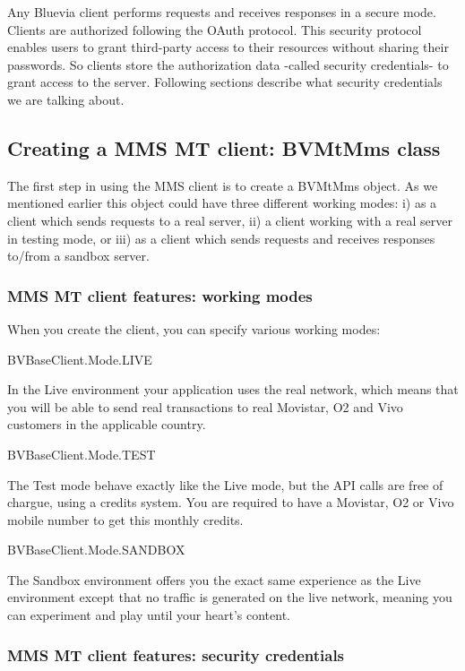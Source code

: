Any Bluevia client performs requests and receives responses in a secure mode. Clients are authorized following the OAuth protocol. This security protocol enables users to grant third-\/party access to their resources without sharing their passwords. So clients store the authorization data -\/called security credentials-\/ to grant access to the server. Following sections describe what security credentials we are talking about.\hypertarget{blv_mms_mt_guide_creating_a_mms_mt_client_sec}{}\subsection{Creating a MMS MT client: BVMtMms class}\label{blv_mms_mt_guide_creating_a_mms_mt_client_sec}
The first step in using the MMS client is to create a BVMtMms object. As we mentioned earlier this object could have three different working modes: i) as a client which sends requests to a real server, ii) a client working with a real server in testing mode, or iii) as a client which sends requests and receives responses to/from a sandbox server.\hypertarget{blv_mms_mt_guide_mms_mt_client_features_working_modes_sec}{}\subsubsection{MMS MT client features: working modes}\label{blv_mms_mt_guide_mms_mt_client_features_working_modes_sec}
When you create the client, you can specify various working modes: 
\begin{DoxyItemize}
\item BVBaseClient.Mode.LIVE \par
In the Live environment your application uses the real network, which means that you will be able to send real transactions to real Movistar, O2 and Vivo customers in the applicable country.


\item BVBaseClient.Mode.TEST \par
The Test mode behave exactly like the Live mode, but the API calls are free of chargue, using a credits system. You are required to have a Movistar, O2 or Vivo mobile number to get this monthly credits.


\item BVBaseClient.Mode.SANDBOX \par
The Sandbox environment offers you the exact same experience as the Live environment except that no traffic is generated on the live network, meaning you can experiment and play until your heart’s content. 
\end{DoxyItemize}\hypertarget{blv_mms_mt_guide_mms_mt_client_features_security_credentials}{}\subsubsection{MMS MT client features: security credentials}\label{blv_mms_mt_guide_mms_mt_client_features_security_credentials}
